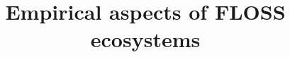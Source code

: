 \documentclass[11pt]{book}
\begin{document}
\title{Empirical aspects of FLOSS ecosystems}

\maketitle











\end{document}
